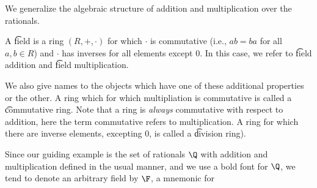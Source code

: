 

We generalize the algebraic structure of addition and multiplication over the rationals.


A \t{field} is a ring $(R, +, \cdot )$ for which $\cdot $ is commutative (i.e., $ab = ba$ for all $a, b \in R$) and $\cdot $ has inverses for all elements except $0$.
In this case, we refer to \t{field addition} and \t{field multiplication}.

We also give names to the objects which have one of these additional properties or the other.
A ring which for which multipliation is commutative is called a \t{commutative ring}.
Note that a ring is \textit{always} commutative with respect to addition, here the term commutative refers to multiplication.
A ring for which there are inverse elements, excepting 0, is called a \t{division ring}).


Since our guiding example is the set of rationals $\Q $ with addition and multiplication defined in the usual manner, and we use a bold font for $\Q $, we tend to denote an arbitrary field by $\F $, a mnemonic for 

\blankpage
